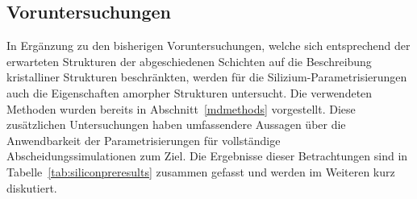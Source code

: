 \subsection{Voruntersuchungen}

In Ergänzung zu den bisherigen Voruntersuchungen, welche sich entsprechend der erwarteten Strukturen der abgeschiedenen Schichten auf die Beschreibung kristalliner Strukturen beschränkten, werden für die Silizium-Parametrisierungen auch die Eigenschaften amorpher Strukturen untersucht.
Die verwendeten Methoden wurden bereits in Abschnitt~\ref{mdmethods} vorgestellt.
Diese zusätzlichen Untersuchungen haben umfassendere Aussagen über die Anwendbarkeit der Parametrisierungen für vollständige Abscheidungssimulationen zum Ziel.
Die Ergebnisse dieser Betrachtungen sind in Tabelle~\ref{tab:siliconpreresults} zusammen gefasst und werden im Weiteren kurz diskutiert.

